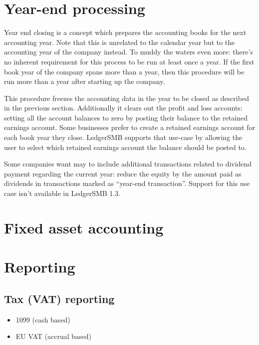 \section{Year-end processing}
\label{sec-workflows-accounting-year-end-processing}

Year end closing is a concept which prepares the accounting books for the next
accounting year. Note that this is unrelated to the calendar year but to the
accounting year of the company instead. To muddy the waters even more: there's
no inherent requirement for this process to be run at least once a year. If the
first book year of the company spans more than a year, then this procedure will
be run more than a year after starting up the company.

This procedure freezes the accounting data in the year to be closed as described
in the previous section. Additionally it clears out the profit and loss accounts:
setting all the account
balances to zero by posting their balance to the retained earnings account. Some
businesses prefer to create a retained earnings account for each book year they
close. LedgerSMB supports that use-case by allowing the user to select which
retained earnings account the balance should be posted to.

Some companies want may to include additional transactions related to dividend
payment regarding the current year: reduce the equity by the amount paid as
dividends in transactions marked as ``year-end transaction''. Support
for this use case isn't available in LedgerSMB 1.3.




\section{Fixed asset accounting}
\label{sec-workflows-accounting-fixed-asset-accounting}



\section{Reporting}
\label{sec-workflows-accounting-reporting}

\subsection{Tax (VAT) reporting}
\label{subsec-workflows-accounting-reporting-tax}


\begin{itemize}
\item 1099 (cash based)
\item EU VAT (accrual based)
\end{itemize}


